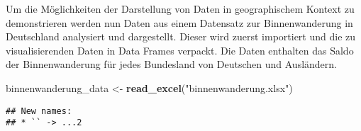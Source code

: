 \documentclass[]{article}
\newenvironment{Shaded}{\begin{snugshade}}{\end{snugshade}}
\newcommand{\KeywordTok}[1]{\textcolor[rgb]{0.13,0.29,0.53}{\textbf{#1}}}
\newcommand{\NormalTok}[1]{#1}
\newcommand{\StringTok}[1]{\textcolor[rgb]{0.31,0.60,0.02}{#1}}
\begin{document}
Um die Möglichkeiten der Darstellung von Daten in geographischem Kontext
zu demonstrieren werden nun Daten aus einem Datensatz zur
Binnenwanderung in Deutschland analysiert und dargestellt. Dieser wird
zuerst importiert und die zu visualisierenden Daten in Data Frames
verpackt. Die Daten enthalten das Saldo der Binnenwanderung für jedes
Bundesland von Deutschen und Ausländern.

\begin{Shaded}
\begin{Highlighting}[]
\NormalTok{binnenwanderung_data <-}\StringTok{ }\KeywordTok{read_excel}\NormalTok{(}\StringTok{"binnenwanderung.xlsx"}\NormalTok{)}
\end{Highlighting}
\end{Shaded}

\begin{verbatim}
## New names:
## * `` -> ...2
\end{verbatim}
\end{document}
